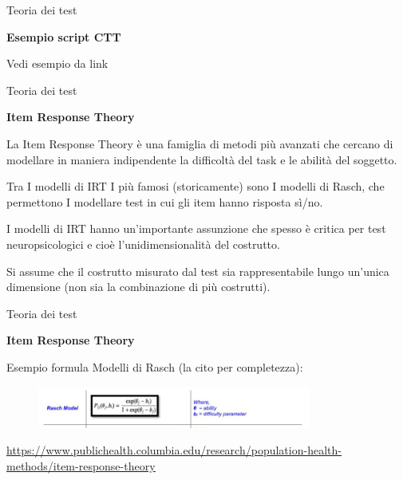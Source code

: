 \documentclass[
  ignorenonframetext,
]{beamer}
\begin{document}
\begin{frame}{Teoria dei test}
\label{teoria-dei-test-3}
\begin{center}
  \textbf{Esempio script CTT}
\end{center}

Vedi esempio da link
\end{frame}

\begin{frame}{Teoria dei test}
\label{teoria-dei-test-4}
\begin{center}
  \textbf{Item Response Theory}
\end{center}

La Item Response Theory è una famiglia di metodi più avanzati che
cercano di modellare in maniera indipendente la difficoltà del task e le
abilità del soggetto.

Tra I modelli di IRT I più famosi (storicamente) sono I modelli di
Rasch, che permettono I modellare test in cui gli item hanno risposta
sì/no. \pause

I modelli di IRT hanno un'importante assunzione che spesso è critica per
test neuropsicologici e cioè l'unidimensionalità del costrutto. \pause

Si assume che il costrutto misurato dal test sia rappresentabile lungo
un'unica dimensione (non sia la combinazione di più costrutti).
\end{frame}

\begin{frame}{Teoria dei test}
\label{teoria-dei-test-5}
\begin{center}
  \textbf{Item Response Theory}
\end{center}

Esempio formula Modelli di Rasch (la cito per completezza): \vspace{2em}

\begin{figure}
  \includegraphics[width=0.8\textwidth]{Figures/Rasch.png}
\end{figure}
\vspace{2em}

\href{https://www.publichealth.columbia.edu/research/population-health-methods/item-response-theory}{\ul{https://www.publichealth.columbia.edu/research/population-health-methods/item-response-theory}}
\end{frame}
\end{document}
